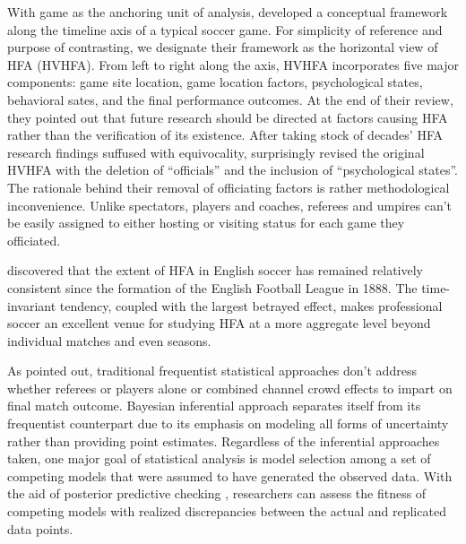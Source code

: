 \documentclass[]{interact}
\theoremstyle{plain}%
\theoremstyle{definition}
\theoremstyle{remark}
\begin{document}
With game as the anchoring unit of analysis, \cite{Courneya1992} developed a conceptual framework along the timeline axis of a typical soccer game. For simplicity of reference and purpose of contrasting, we designate their framework as the horizontal view of HFA (HVHFA). From left to right along the axis, HVHFA incorporates five major components: game site location, game location factors, psychological states, behavioral sates, and the final performance outcomes. At the end of their review, they pointed out that future research should be directed at factors causing HFA rather than the verification of its existence. After taking stock of decades' HFA research findings suffused with equivocality, \cite{Carron2005} surprisingly revised the original HVHFA with the deletion of ``officials'' and the inclusion of ``psychological states''. The rationale behind their removal of officiating factors is rather methodological inconvenience. Unlike spectators, players and coaches, referees and umpires can't be easily assigned to either hosting or visiting status for each game they officiated. 


\cite{Pollard1986} discovered that the extent of HFA in English soccer has remained relatively consistent since the formation of the English Football League in 1888. The time-invariant tendency, coupled with the largest betrayed effect, makes professional soccer an excellent venue for studying HFA at a more aggregate level beyond individual matches and even seasons. 

As \cite{Boyko2007} pointed out, traditional frequentist statistical approaches don't address whether referees or players alone or combined channel crowd effects to impart on final match outcome. Bayesian inferential approach separates itself from its frequentist counterpart due to its emphasis on modeling all forms of uncertainty rather than providing point estimates. Regardless of the inferential approaches taken, one major goal of statistical analysis is model selection among a set of competing models that were assumed to have generated the observed data. With the aid of posterior predictive checking \citep{Gelman1996}, researchers can assess the fitness of competing models with realized discrepancies between the actual and replicated data points. 
\end{document}
